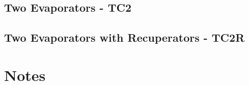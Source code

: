 \documentclass[a4paper, 12pt]{article}
\begin{document}
\subsection{Two Evaporators - TC2}


\subsection{Two Evaporators with Recuperators - TC2R}


\newpage
\section{Notes}



\newpage




\end{document}
